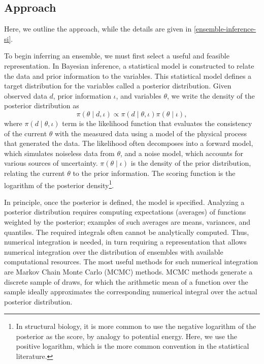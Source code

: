 \documentclass[../../main.tex]{subfiles}
\begin{document}
\begin{refsection}
	\section{Approach}\label{approach}

	Here, we outline the approach, while the details are given in \cref{ensemble-inference-si}.


	To begin inferring an ensemble, we must first select a useful and feasible representation.
	In Bayesian inference, a statistical model is constructed to relate the data and prior information to the variables.
	This statistical model defines a target distribution for the variables called a posterior distribution.
	Given observed data $d$, prior information $\iota$, and variables $\theta$, we write the density of the posterior distribution as
	$$\pi(\theta \mid d, \iota) \propto \pi(d \mid \theta, \iota) \pi(\theta \mid \iota),$$
	where $\pi(d \mid \theta, \iota)$ term is the likelihood function that evaluates the consistency of the current $\theta$ with the measured data using a model of the physical process that generated the data.
	The likelihood often decomposes into a forward model, which simulates noiseless data from $\theta$, and a noise model, which accounts for various sources of uncertainty.
	$\pi(\theta \mid \iota)$ is the density of the prior distribution, relating the current $\theta$ to the prior information.
	The scoring function is the logarithm of the posterior density\footnote{
		In structural biology, it is more common to use the negative logarithm of the posterior as the score, by analogy to potential energy.
		Here, we use the positive logarithm, which is the more common convention in the statistical literature.}.

	In principle, once the posterior is defined, the model is specified.
	Analyzing a posterior distribution requires computing expectations (averages) of functions weighted by the posterior; examples of such averages are means, variances, and quantiles.
	The required integrals often cannot be analytically computed.
	Thus, numerical integration is needed, in turn requiring a representation that allows numerical integration over the distribution of ensembles with available computational resources.
	The most useful methods for such numerical integration are Markov Chain Monte Carlo (MCMC) methods.
	MCMC methods generate a discrete sample of draws, for which the arithmetic mean of a function over the sample ideally approximates the corresponding numerical integral over the actual posterior distribution.


\end{refsection}
\end{document}
